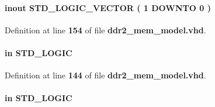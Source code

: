 \paragraph[{mem\+\_\+dqs\+\_\+n}]{ {\bfseries \textcolor{keywordflow}{inout}\textcolor{vhdlchar}{ }} {\bfseries \textcolor{comment}{S\+T\+D\+\_\+\+L\+O\+G\+I\+C\+\_\+\+V\+E\+C\+T\+OR}\textcolor{vhdlchar}{ }\textcolor{vhdlchar}{(}\textcolor{vhdlchar}{ }\textcolor{vhdlchar}{ } \textcolor{vhdldigit}{1} \textcolor{vhdlchar}{ }\textcolor{keywordflow}{D\+O\+W\+N\+TO}\textcolor{vhdlchar}{ }\textcolor{vhdlchar}{ } \textcolor{vhdldigit}{0} \textcolor{vhdlchar}{ }\textcolor{vhdlchar}{)}\textcolor{vhdlchar}{ }} \hspace{0.3cm}{\ttfamily [Port]}}\label{classddr2__mem__model_a8f6a979c32972083c02a2c87725f02fd}


Definition at line {\bf 154} of file {\bf ddr2\+\_\+mem\+\_\+model.\+vhd}.

\paragraph[{mem\+\_\+odt}]{ {\bfseries \textcolor{keywordflow}{in}\textcolor{vhdlchar}{ }} {\bfseries \textcolor{comment}{S\+T\+D\+\_\+\+L\+O\+G\+IC}\textcolor{vhdlchar}{ }} \hspace{0.3cm}{\ttfamily [Port]}}\label{classddr2__mem__model_a6629d30640cd976e959b9228e7fe181f}


Definition at line {\bf 144} of file {\bf ddr2\+\_\+mem\+\_\+model.\+vhd}.

\paragraph[{mem\+\_\+ras\+\_\+n}]{ {\bfseries \textcolor{keywordflow}{in}\textcolor{vhdlchar}{ }} {\bfseries \textcolor{comment}{S\+T\+D\+\_\+\+L\+O\+G\+IC}\textcolor{vhdlchar}{ }} \hspace{0.3cm}{\ttfamily [Port]}}\label{classddr2__mem__model_a525177d7ed4260e623da059628977b5e}



